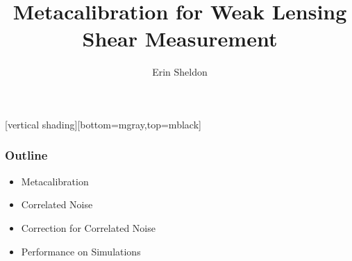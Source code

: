 \documentclass{beamer}
\title{Metacalibration for Weak Lensing Shear Measurement}
\author{Erin Sheldon}
\institute{Brookhaven National Laboratory}
\begin{document}
\frame{\titlepage}


[vertical shading][bottom=mgray,top=mblack]

\frame
{
    \frametitle{Outline}

 
    \begin{itemize}

        \item Metacalibration

        \item Correlated Noise

        \item Correction for Correlated Noise

        \item Performance on Simulations

    \end{itemize}

}
\end{document}
